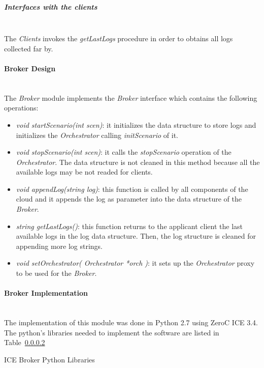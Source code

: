 \subparagraph{Interfaces with the clients}~\\

The \emph{Clients} invokes the \emph{getLastLogs} procedure in order to obtains
all logs collected far by.

\paragraph{Broker Design}~\\

The \emph{Broker} module implements the \emph{Broker} interface which
contains the following operations:

\begin{itemize}
\item \emph{void startScenario(int scen)}: it initializes the data structure to
  store logs and initializes the \emph{Orchestrator} calling \emph{initScenario}
  of it.
\item \emph{void stopScenario(int scen)}: it calls the \emph{stopScenario}
  operation of the \emph{Orchestrator}. The data structure is not cleaned in
  this method because all the available logs may be not readed for clients.
\item \emph{void appendLog(string log)}: this function is called by all
  components of the  cloud and it appends the log as parameter into the data
  structure of the \emph{Broker}. 
\item \emph{string getLastLogs()}: this function returns to the applicant client
  the last available logs in the log data structure. Then, the log structure is
  cleaned for appending more log strings.
\item \emph{void setOrchestrator( Orchestrator *orch )}: it sets up the \emph{Orchestrator} proxy to be
  used for the \emph{Broker}.
\end{itemize}


\paragraph{Broker Implementation}~\\

The implementation of this module was done in Python 2.7 using ZeroC ICE 3.4. The
python's libraries needed to implement the software are listed in
Table~\ref{}

\begin{table}[hp]
  \centering
  {\small
  
  }
  \caption{ICE Broker Python Libraries}
  \label{table:broker-libraries}
\end{table}


